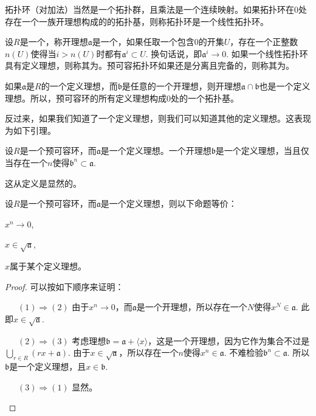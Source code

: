 拓扑环（对加法）当然是一个拓扑群，且乘法是一个连续映射。如果拓扑环在$0$处存在一个一族开理想构成的的拓扑基，则称拓扑环是一个线性拓扑环。

\begin{para}
设$R$是一个，称开理想$\mathfrak{a}$是一个，如果任取一个包含$0$的开集$U$，存在一个正整数$n(U)$使得当$i>n(U)$时都有$\mathfrak{a}^i\subset U$. 换句话说，即$\mathfrak{a}^i\to 0$. 如果一个线性拓扑环具有定义理想，则称其为。预可容拓扑环如果还是分离且完备的，则称其为。
\end{para}

如果$\mathfrak{a}$是$R$的一个定义理想，而$\mathfrak{b}$是任意的一个开理想，则开理想$\mathfrak{a}\cap \mathfrak{b}$也是一个定义理想。所以，预可容环的所有定义理想构成$0$处的一个拓扑基。

反过来，如果我们知道了一个定义理想，则我们可以知道其他的定义理想。这表现为如下引理。

\begin{lem}
设$R$是一个预可容环，而$\mathfrak{a}$是一个定义理想。一个开理想$\mathfrak{b}$是一个定义理想，当且仅当存在一个$n$使得$\mathfrak{b}^n\subset \mathfrak{a}$.
\end{lem}

这从定义是显然的。

\begin{pro}设$R$是一个预可容环，而$\mathfrak{a}$是一个定义理想，则以下命题等价：
\begin{compactenum}[~~~(1)]
\item $x^n\to 0$,
\item $x\in \sqrt{\mathfrak{a}}$,
\item $x$属于某个定义理想。
\end{compactenum}
\end{pro}

\begin{proof}可以按如下顺序来证明：
\begin{compactitem}
\item[~~~$(1)\Rightarrow (2)$] 由于$x^n \to 0$，而$\mathfrak{a}$是一个开理想，所以存在一个$N$使得$x^N\in \mathfrak{a}$. 此即$x\in \sqrt{\mathfrak{a}}$.
\item[~~~$(2)\Rightarrow (3)$] 考虑理想$\mathfrak{b}=\mathfrak{a}+\langle x\rangle$，这是一个开理想，因为它作为集合不过是$\bigcup_{r\in R}(rx+\mathfrak{a})$. 由于$x\in \sqrt{\mathfrak{a}}$，所以存在一个$n$使得$x^n \in \mathfrak{a}$. 不难检验$\mathfrak{b}^n\subset \mathfrak{a}$. 所以$\mathfrak{b}$是一个定义理想，且$x\in \mathfrak{b}$.
\item[~~~$(3)\Rightarrow (1)$] 显然。
\end{compactitem}
\end{proof}

